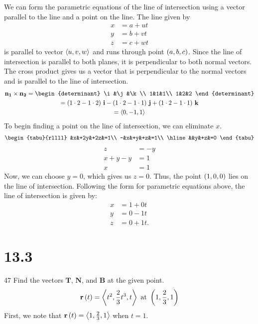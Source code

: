 \documentclass[12pt]{article}
\begin{document}
We can form the parametric equations of the line of intersection using a vector parallel to the line and a point on the line.
The line given by
%
\begin{align*}
x&=a+ut\\
y&=b+vt\\
z&=c+wt
\end{align*}
%
is parallel to vector $\left\langle{u,v,w}\right\rangle$ and runs through point $\left({a,b,c}\right)$. Since the line of intersection is parallel to
both planes, it is perpendicular to both normal vectors. The cross product gives us a vector that is perpendicular to the
normal vectors and is parallel to the line of intersection.
%
\begin{gather*}
\mathbf{n_1}\cross\mathbf{n_2}=\begin{determinant}
\i&\j&\k\\
1&1&1\\
1&2&2
\end{determinant}\\
=\paren{1\times{2}-1\times{2}}\i-\paren{1\times{2}-1\times{1}}\j+\paren{1\times{2}-1\times{1}}\k\\
=\vector{0,-1,1}
\end{gather*}
%
To begin finding a point on the line of intersection, we can eliminate $x$.
%
\begin{gather*}
\begin{tabu}{rllll}
&x&+2y&+2z&=1\\
-&x&+y&+z&=1\\
\hline
&&y&+z&=0
\end{tabu}
\end{gather*}
\begin{align*}
z&=-y\\
x+y-y&=1\\
x&=1
\end{align*}
%
Now, we can choose $y=0$, which gives us $z=0$. Thus, the point $\left({1,0,0}\right)$ lies on the line of intersection. Following the
form for parametric equations above, the line of intersection is given by:
%
\begin{align*}
x&=1+0t\\
y&=0-1t\\
z&=0+1t.
\end{align*}

\section{13.3}{47}
Find the vectors $\mathbf{T}$, $\mathbf{N}$, and $\mathbf{B}$ at the given point.
%
\begin{equation*}
\mathbf{r}\left({t}\right)=\left\langle{t^2,\frac{2}{3}t^3,t}\right\rangle\text{ at }\left({1,\frac{2}{3},1}\right)
\end{equation*}
%
First, we note that $\mathbf{r}\left({t}\right)=\left\langle{1,\frac{2}{3},1}\right\rangle$ when $t=1$.\double
\end{document}
